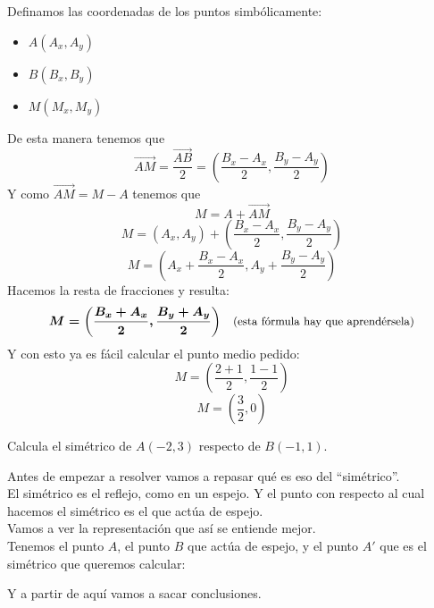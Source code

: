 \documentclass[a4paper,11pt,answers]{exam}
\begin{document}
\begin{questions}
\begin{solution}
    Definamos las coordenadas de los puntos simbólicamente:
    \begin{itemize}
    \item $A(A_x,A_y)$
    \item $B(B_x,B_y)$
    \item $M(M_x,M_y)$
    \end{itemize}
    De esta manera tenemos que
    \[\overrightarrow{AM} = \frac{\overrightarrow{AB}}{2} = \left(\frac{B_x-A_x}{2},
        \frac{B_y-A_y}{2}\right)\]
    Y como $\overrightarrow{AM} = M - A$ tenemos que
    \[M = A + \overrightarrow{AM}\]
    \[M = (A_x,A_y) + \left(\frac{B_x-A_x}{2},\frac{B_y-A_y}{2}\right)\]
    \[M = \left(A_x + \frac{B_x-A_x}{2}, A_y + \frac{B_y-A_y}{2}\right)\]
    Hacemos la resta de fracciones y resulta:
    \[\boldsymbol{M = \left(\frac{B_x+A_x}{2},\frac{B_y+A_y}{2}\right)}
      \quad\text{\small{(esta fórmula hay que aprendérsela)}}\]
    Y con esto ya es fácil calcular el punto medio pedido:
    \[M = \left(\frac{2+1}{2}, \frac{1-1}{2}\right)\]
    \[M = \left(\frac{3}{2}, 0\right)\]
  \end{solution}
\question Calcula el simétrico de $A(-2, 3)$ respecto de $B(-1,1)$.
  \begin{solution}
    Antes de empezar a resolver vamos a repasar qué es eso del ``simétrico''.\\

    El simétrico es el reflejo, como en un espejo. Y el punto con respecto al cual hacemos
    el simétrico es el que actúa de espejo.\\
    
    Vamos a ver la representación que así se entiende mejor.\\
    Tenemos el punto $A$, el punto $B$ que actúa de espejo, y el punto $A'$ que es el simétrico
    que queremos calcular:
    \begin{center}
    \end{center}
    Y a partir de aquí vamos a sacar conclusiones.\\


\end{solution}
\end{questions}
\end{document}
